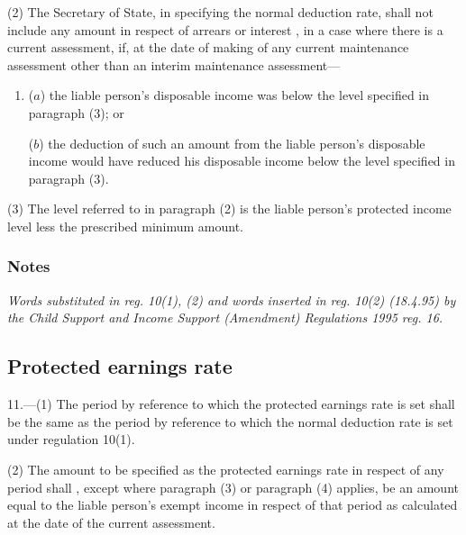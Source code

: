 \documentclass[a4paper]{article}
\newcommand\amendment[1]{\subsubsection*{Notes}{\itshape\frenchspacing\footnotesize #1 \par}}
\begin{document}
(2) The Secretary of State, in specifying the normal deduction rate, shall not include any amount in respect of arrears or interest%
, in a case where there is a current assessment,  %
if, 
at the date of making of any current maintenance assessment other than an interim maintenance assessment---  %
\begin{enumerate}\item[]
($a$) the liable person’s disposable income was below the level specified in paragraph (3); or

($b$) the deduction of such an amount from the liable person’s disposable income would have reduced his disposable income below the level specified in paragraph (3).
\end{enumerate}

(3) The level referred to in paragraph (2) is the liable person’s protected income level less the prescribed minimum amount.

\amendment{
Words substituted in reg. 10(1), (2) and words inserted in reg. 10(2) (18.4.95) by the Child Support and Income Support (Amendment) Regulations 1995 reg. 16.
}

\subsection[11. Protected earnings rate]{Protected earnings rate}

11.—(1) The period by reference to which the protected earnings rate is set shall be the same as the period by reference to which the normal deduction rate is set under regulation 10(1).

(2) The amount to be specified as the protected earnings rate in respect of any period shall%
, except where paragraph (3) or paragraph (4) applies,  %
be an amount equal to the liable person’s exempt income in respect of that period as calculated at the date of the current assessment.
\end{document}
